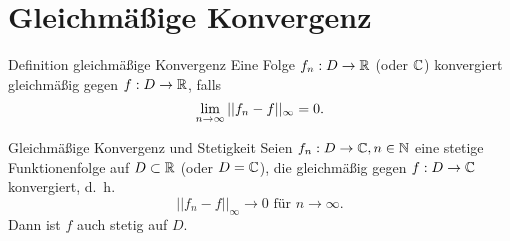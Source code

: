 \documentclass[main.tex]{subfiles}
\begin{document}
\section*{Gleichmäßige Konvergenz}

\begin{karte}{Definition gleichmäßige Konvergenz}
    Eine Folge \( f_n : D \rightarrow \mathbb{R} \) (oder \( \mathbb{C} \)) 
    konvergiert gleichmäßig gegen \( f: D \rightarrow \mathbb{R} \), 
    falls 
    \[ \lim\limits_{n\rightarrow\infty} ||f_n - f ||_\infty = 0. \]
\end{karte}
\begin{karte}{Gleichmäßige Konvergenz und Stetigkeit}
    Seien \( f_n : D \rightarrow \mathbb{C}, n\in\mathbb{N} \) eine 
    stetige Funktionenfolge auf \( D \subset \mathbb{R} \) 
    (oder \( D = \mathbb{C} \)), die gleichmäßig gegen 
    \( f: D \rightarrow \mathbb{C} \) konvergiert, d.\ h.\ 
    \[ ||f_n - f||_\infty \rightarrow 0 
    \text{ für } n\rightarrow\infty. \]
    Dann ist \(f\) auch stetig auf \(D\).
\end{karte}
\end{document}
